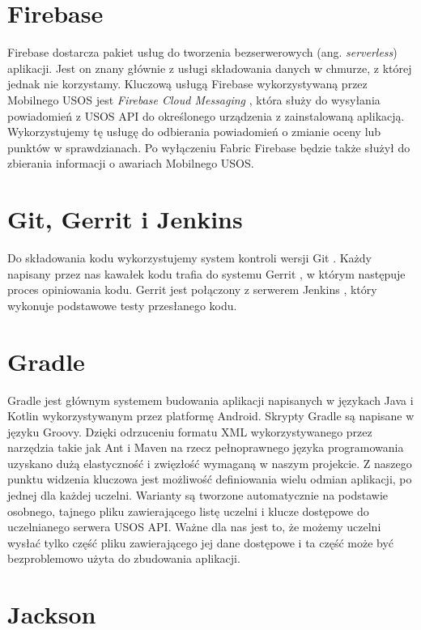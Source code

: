 \documentclass{pracamgr}
\begin{document}
\section{Firebase}

Firebase \cite{firebase} dostarcza pakiet usług do tworzenia bezserwerowych
(ang. \textit{serverless}) aplikacji. Jest on znany głównie z usługi składowania
danych w chmurze, z której jednak nie korzystamy. Kluczową usługą Firebase
wykorzystywaną przez Mobilnego USOS jest \textit{Firebase Cloud Messaging}
\cite{firebasecm}, która służy do wysyłania powiadomień z USOS API do określonego
urządzenia z zainstalowaną aplikacją. Wykorzystujemy tę usługę do odbierania
powiadomień o zmianie oceny lub punktów w sprawdzianach. Po wyłączeniu Fabric
Firebase będzie także służył do zbierania informacji o awariach Mobilnego USOS.

\section{Git, Gerrit i Jenkins}

Do składowania kodu wykorzystujemy system kontroli wersji Git \cite{git}. Każdy
napisany przez nas kawałek kodu trafia do systemu Gerrit \cite{gerrit}, w którym
następuje proces opiniowania kodu. Gerrit jest połączony z serwerem Jenkins
\cite{jenkins}, który wykonuje podstawowe testy przesłanego kodu.

\section{Gradle}

Gradle \cite{gradle} jest głównym systemem budowania aplikacji napisanych w
językach Java i Kotlin wykorzystywanym przez platformę Android. Skrypty Gradle
są napisane w języku Groovy. Dzięki odrzuceniu formatu XML wykorzystywanego przez
narzędzia takie jak Ant i Maven na rzecz pełnoprawnego języka programowania
uzyskano dużą elastyczność i zwięzłość wymaganą w naszym projekcie. Z naszego
punktu widzenia kluczowa jest możliwość definiowania wielu odmian aplikacji, po
jednej dla każdej uczelni. Warianty są tworzone automatycznie na podstawie osobnego,
tajnego pliku zawierającego listę uczelni i klucze dostępowe do uczelnianego serwera
USOS API. Ważne dla nas jest to, że możemy uczelni wysłać tylko część pliku zawierającego
jej dane dostępowe i ta część może być bezproblemowo użyta do zbudowania aplikacji.

\section{Jackson}
\end{document}
